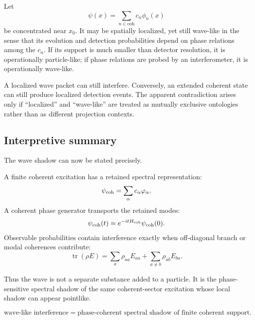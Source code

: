 \documentclass[11pt]{article}
\newcommand{\coh}{\mathrm{coh}}
\begin{document}
Let
\begin{equation}
  \psi(x)
  =
  \sum_{n\in\coh}
  c_n\phi_n(x)
\end{equation}
be concentrated near \(x_0\). It may be spatially localized, yet still wave-like in the sense that
its evolution and detection probabilities depend on phase relations among the \(c_n\). If its
support is much smaller than detector resolution, it is operationally particle-like; if phase
relations are probed by an interferometer, it is operationally wave-like.

\begin{remark}
\label{rem:no-contradiction-local-interference}
A localized wave packet can still interfere. Conversely, an extended coherent state can still
produce localized detection events. The apparent contradiction arises only if ``localized'' and
``wave-like'' are treated as mutually exclusive ontologies rather than as different projection
contexts.
\end{remark}

\subsection{Interpretive summary}
\label{subsec:wave-summary}

The wave shadow can now be stated precisely.

A finite coherent excitation has a retained spectral representation:
\begin{equation}
  \psi_{\rm coh}
  =
  \sum_{\alpha}c_\alpha\varphi_\alpha.
\end{equation}
A coherent phase generator transports the retained modes:
\begin{equation}
  \psi_{\rm coh}(t)=e^{-itH_{\rm coh}}\psi_{\rm coh}(0).
\end{equation}
Observable probabilities contain interference exactly when off-diagonal branch or modal
coherences contribute:
\begin{equation}
  \operatorname{tr}(\rho E)
  =
  \sum_a \rho_{aa}E_{aa}
  +
  \sum_{a\neq b}\rho_{ab}E_{ba}.
\end{equation}

Thus the wave is not a separate substance added to a particle. It is the phase-sensitive
spectral shadow of the same coherent-sector excitation whose local shadow can appear
pointlike.

\begin{equation}
  \boxed{
  \text{wave-like interference}
  =
  \text{phase-coherent spectral shadow of finite coherent support}.
  }
\end{equation}
\end{document}
